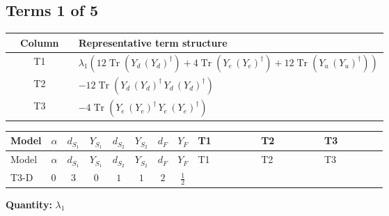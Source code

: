 \documentclass[8pt]{article}
\begin{document}
\begin{landscape}
\subsection*{Terms 1 of 5}
\begin{center}
\begin{tabular}{@{}c >{\raggedright\arraybackslash}p{0.82\linewidth}@{}}
\toprule
Column & Representative term structure \\
\midrule
T1 & \(\displaystyle {\lambda_1} (12 \operatorname{Tr}\!\left({Y_d}\,\left({Y_d}\right)^{\dagger}\right)+4 \operatorname{Tr}\!\left({Y_e}\,\left({Y_e}\right)^{\dagger}\right)+12 \operatorname{Tr}\!\left({Y_u}\,\left({Y_u}\right)^{\dagger}\right))\) \\
\midrule
T2 & \(\displaystyle -12 \operatorname{Tr}\!\left({Y_d}\,\left({Y_d}\right)^{\dagger}\,{Y_d}\,\left({Y_d}\right)^{\dagger}\right)\) \\
\midrule
T3 & \(\displaystyle -4 \operatorname{Tr}\!\left({Y_e}\,\left({Y_e}\right)^{\dagger}\,{Y_e}\,\left({Y_e}\right)^{\dagger}\right)\) \\
\midrule
\bottomrule
\end{tabular}
\end{center}
\smallskip
\tiny
\begin{longtable}{@{}llcccccc >{\raggedright\arraybackslash}p{0.21\linewidth} >{\raggedright\arraybackslash}p{0.21\linewidth} >{\raggedright\arraybackslash}p{0.21\linewidth}@{}}
\toprule
Model & $\alpha$ & $d_{S_1}$ & $Y_{S_1}$ & $d_{S_2}$ & $Y_{S_2}$ & $d_F$ & $Y_F$ & T1 & T2 & T3 \\
\midrule
\endfirsthead
\toprule
Model & $\alpha$ & $d_{S_1}$ & $Y_{S_1}$ & $d_{S_2}$ & $Y_{S_2}$ & $d_F$ & $Y_F$ & T1 & T2 & T3 \\
\midrule
\endhead
T3-D & $0$ & $3$ & $0$ & $1$ & $1$ & $2$ & $\frac{1}{2}$ & \scriptsize\adjustbox{max width=\linewidth}{$\begin{gathered} {\lambda_1} (12 \operatorname{Tr}\!\left({Y_d}\,\left({Y_d}\right)^{\dagger}\right)+4 \operatorname{Tr}\!\left({Y_e}\,\left({Y_e}\right)^{\dagger}\right)+12 \operatorname{Tr}\!\left({Y_u}\,\left({Y_u}\right)^{\dagger}\right))\end{gathered}$} & \scriptsize\adjustbox{max width=\linewidth}{$\begin{gathered} -12 \operatorname{Tr}\!\left({Y_d}\,\left({Y_d}\right)^{\dagger}\,{Y_d}\,\left({Y_d}\right)^{\dagger}\right)\end{gathered}$} & \scriptsize\adjustbox{max width=\linewidth}{$\begin{gathered} -4 \operatorname{Tr}\!\left({Y_e}\,\left({Y_e}\right)^{\dagger}\,{Y_e}\,\left({Y_e}\right)^{\dagger}\right)\end{gathered}$} \\
\midrule
\bottomrule
\end{longtable}
\clearpage
\noindent\textbf{Quantity: }$\lambda_1$\par\smallskip

\end{landscape}
\end{document}
